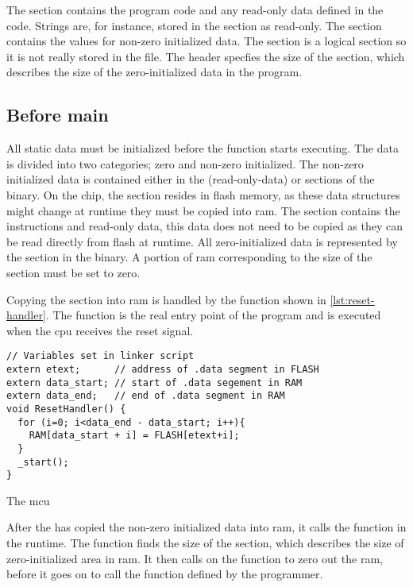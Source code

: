 The  section contains the program code and any read-only data defined in the code.
Strings are, for instance, stored in the  section as read-only.
The  section contains the values for non-zero initialized data.
The  section is a logical section so it is not really stored in the file.
The header specfies the size of the  section, which describes the size of the zero-initialized data in the program.

\subsection{Before main}
\label{sec:before-main}
All static data must be initialized before the  function starts executing.
The data is divided into two categories; zero and non-zero initialized.
The non-zero initialized data is contained either in the  (read-only-data) or  sections of the {\elf} binary.
On the chip, the  section resides in flash memory, as these data structures might change at runtime they must be copied into \gls{ram}.
The  section contains the instructions and read-only data, this data does not need to be copied as they can be read directly from flash at runtime.
All zero-initialized data is represented by the  section in the {\elf} binary.
A portion of \gls{ram} corresponding to the size of the  section must be set to zero.

Copying the  section into \gls{ram} is handled by the  function shown in \autoref{lst:reset-handler}.
The function is the real entry point of the program and is executed when the \gls{cpu} receives the reset signal.

\begin{listing}[H]
\begin{verbatim}
// Variables set in linker script
extern etext;      // address of .data segment in FLASH
extern data_start; // start of .data segement in RAM
extern data_end;   // end of .data segment in RAM
void ResetHandler() {
  for (i=0; i<data_end - data_start; i++){
    RAM[data_start + i] = FLASH[etext+i];
  }
  _start();
}
\end{verbatim}
\caption{The \gls{mcu} }
\label{lst:reset-handler}
\end{listing}

After the  has copied the non-zero initialized data into \gls{ram}, it calls the  function in the {\C} runtime.
The  function finds the size of the  section, which describes the size of zero-initialized area in \gls{ram}.
It then calls on the  function to zero out the \gls{ram}, before it goes on to call the {\main} function defined by the programmer.

